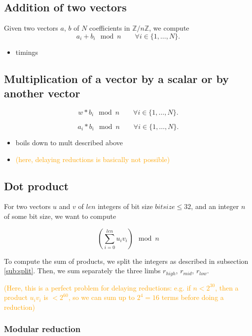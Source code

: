 \documentclass[a4paper]{article}
\begin{document}
\subsection{Addition of two vectors}

Given two vectors $a$, $b$ of $N$ coefficients in $\mathbb{Z}/n\mathbb{Z}$, we compute
\[
a_i + b_i \mod n \qquad \forall i\in \{1,\dots,N\}.
\]

\begin{itemize}
    \item timings
\end{itemize}

\subsection{Multiplication of a vector by a scalar or by another vector}

\[
w * b_i \mod n \qquad \forall i\in \{1,\dots,N\}.
\]

\[
a_i * b_i \mod n \qquad \forall i\in \{1,\dots,N\}.
\]

\begin{itemize}
    \item boils down to mult described above
    \item \textcolor{orange}{(here, delaying reductions is basically not possible)}
\end{itemize}

\subsection{Dot product}

For two vectors $u$ and $v$ of $len$ integers of bit size $bitsize \le 32$, and an integer $n$ of some bit size, we want to compute

\[\left(\sum_{i=0}^{len}u_iv_i\right) \mod n\]

To compute the sum of products, we split the integers as described in subsection \ref{sub:split}. Then, we sum separately the three limbs $r_{high}$, $r_{mid}$, $r_{low}$. %

\textcolor{orange}{(Here, this is a perfect problem for delaying reductions: e.g. if \(n < 2^{30}\), then a product \(u_iv_i\) is \(< 2^{60}\), so we can sum up to \(2^4 = 16\) terms before doing a reduction)}

\subsubsection{Modular reduction}
\end{document}
